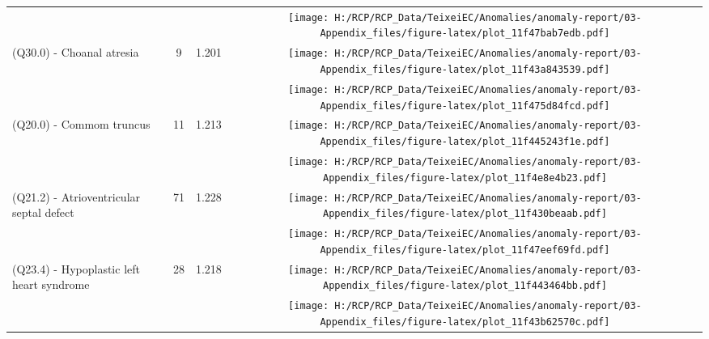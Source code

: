 \documentclass[
]{krantz}
\begin{document}
\begin{longtable}[t]{>{\raggedright\arraybackslash}m{4cm}cc>{}c}
\addlinespace
\cellcolor{gray!6}{(Q16.0, Q17.2) - Anotia / Microtia} & \cellcolor{gray!6}{14} & \cellcolor{gray!6}{1.218} & \cellcolor{gray!6}{}\texttt{[image: H:/RCP/RCP\_Data/TeixeiEC/Anomalies/anomaly-report/03-Appendix\_files/figure-latex/plot\_11f47bab7edb.pdf]}\\
(Q30.0) - Choanal atresia & 9 & 1.201 & \texttt{[image: H:/RCP/RCP\_Data/TeixeiEC/Anomalies/anomaly-report/03-Appendix\_files/figure-latex/plot\_11f43a843539.pdf]}\\
\cellcolor{gray!6}{Selected congenital heart defects} & \cellcolor{gray!6}{211} & \cellcolor{gray!6}{1.226} & \cellcolor{gray!6}{}\texttt{[image: H:/RCP/RCP\_Data/TeixeiEC/Anomalies/anomaly-report/03-Appendix\_files/figure-latex/plot\_11f475d84fcd.pdf]}\\
(Q20.0) - Commom truncus & 11 & 1.213 & \texttt{[image: H:/RCP/RCP\_Data/TeixeiEC/Anomalies/anomaly-report/03-Appendix\_files/figure-latex/plot\_11f445243f1e.pdf]}\\
\cellcolor{gray!6}{(Q20.1, Q20.3, Q20.5) - Transposition of great vessels} & \cellcolor{gray!6}{59} & \cellcolor{gray!6}{1.228} & \cellcolor{gray!6}{}\texttt{[image: H:/RCP/RCP\_Data/TeixeiEC/Anomalies/anomaly-report/03-Appendix\_files/figure-latex/plot\_11f4e8e4b23.pdf]}\\
\addlinespace
(Q21.2) - Atrioventricular septal defect & 71 & 1.228 & \texttt{[image: H:/RCP/RCP\_Data/TeixeiEC/Anomalies/anomaly-report/03-Appendix\_files/figure-latex/plot\_11f430beaab.pdf]}\\
\cellcolor{gray!6}{(Q21.3) - Tetralogy of Fallot} & \cellcolor{gray!6}{33} & \cellcolor{gray!6}{1.224} & \cellcolor{gray!6}{}\texttt{[image: H:/RCP/RCP\_Data/TeixeiEC/Anomalies/anomaly-report/03-Appendix\_files/figure-latex/plot\_11f47eef69fd.pdf]}\\
(Q23.4) - Hypoplastic left heart syndrome & 28 & 1.218 & \texttt{[image: H:/RCP/RCP\_Data/TeixeiEC/Anomalies/anomaly-report/03-Appendix\_files/figure-latex/plot\_11f443464bb.pdf]}\\
\cellcolor{gray!6}{(Q25.1) - Coarctation of aorta} & \cellcolor{gray!6}{54} & \cellcolor{gray!6}{1.225} & \cellcolor{gray!6}{}\texttt{[image: H:/RCP/RCP\_Data/TeixeiEC/Anomalies/anomaly-report/03-Appendix\_files/figure-latex/plot\_11f43b62570c.pdf]}\\

\end{longtable}
\end{document}
